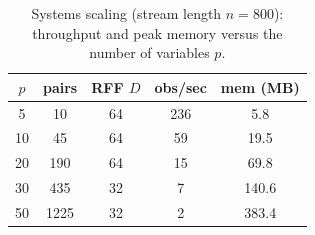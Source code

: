 \begin{table}[htbp]
\centering
\caption{Systems scaling (stream length $n=800$): throughput and peak memory versus the number of variables $p$.}
\label{tab:systems}
\begin{tabular}{ccccc}
\hline
$p$ & pairs & RFF $D$ & obs/sec & mem (MB) \\
\hline
5 & 10 & 64 & 236 & 5.8 \\
10 & 45 & 64 & 59 & 19.5 \\
20 & 190 & 64 & 15 & 69.8 \\
30 & 435 & 32 & 7 & 140.6 \\
50 & 1225 & 32 & 2 & 383.4 \\
\hline
\end{tabular}
\end{table}
